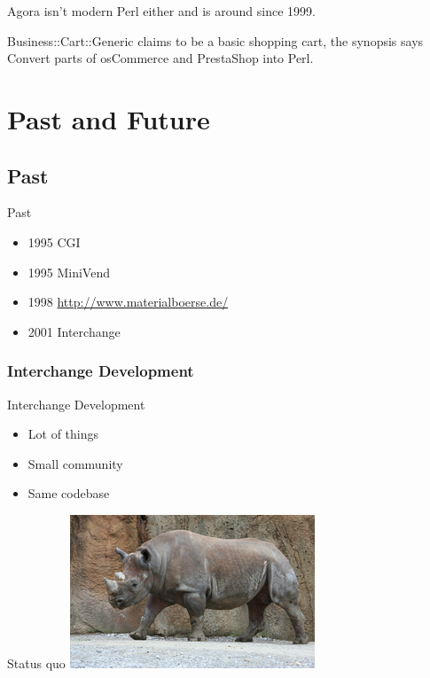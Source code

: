 Agora isn't modern Perl either and is around since 1999.

Business::Cart::Generic claims to be a basic shopping cart,
the synopsis says Convert parts of osCommerce and PrestaShop into
Perl.

\section{Past and Future}

\subsection{Past}
\begin{frame}{Past}
\begin{itemize}
\item 1995 CGI
\item 1995 MiniVend
\item 1998 \url{http://www.materialboerse.de/}
\item 2001 Interchange
\end{itemize}
\end{frame}

\subsubsection{Interchange Development}

\begin{frame}{Interchange Development}
\begin{itemize}
\item Lot of things
\item Small community
\item Same codebase
\end{itemize}
\end{frame}


\begin{frame}{Status quo}
  \includegraphics{rhino.jpg}
\end{frame}

